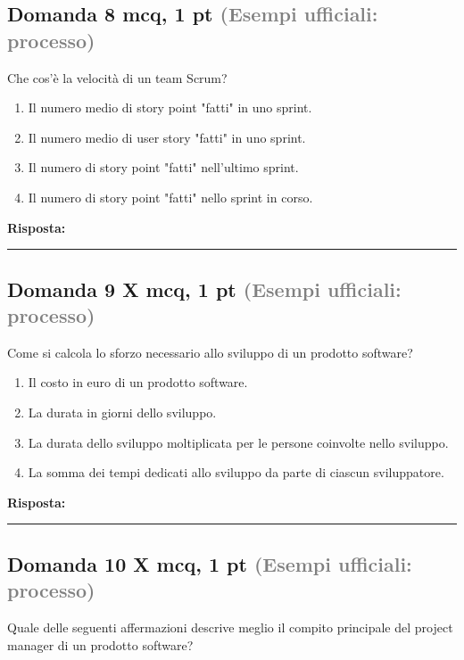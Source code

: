 \documentclass[a4paper,11pt]{article}
\begin{document}
\subsection*{Domanda 8 \hfill {\small mcq, 1 pt \textcolor{gray}{(Esempi ufficiali: processo)}}}
Che cos'è la velocità di un team Scrum?

\begin{enumerate}[label=\alph*)]
\item Il numero medio di story point "fatti" in uno sprint.
\item Il numero medio di user story "fatti" in uno sprint.
\item Il numero di story point "fatti" nell'ultimo sprint.
\item Il numero di story point "fatti" nello sprint in corso.
\end{enumerate}
\vspace{0.2cm}
\noindent\textbf{Risposta:}\par
\vspace{1.5cm}\hrule


\subsection*{Domanda 9 X \hfill {\small mcq, 1 pt \textcolor{gray}{(Esempi ufficiali: processo)}}}
Come si calcola lo sforzo necessario allo sviluppo di un prodotto software?

\begin{enumerate}[label=\alph*)]
\item Il costo in euro di un prodotto software.
\item La durata in giorni dello sviluppo.
\item La durata dello sviluppo moltiplicata per le persone coinvolte nello sviluppo.
\item La somma dei tempi dedicati allo sviluppo da parte di ciascun sviluppatore.
\end{enumerate}
\vspace{0.2cm}
\noindent\textbf{Risposta:}\par
\vspace{1.5cm}\hrule


\subsection*{Domanda 10 X \hfill {\small mcq, 1 pt \textcolor{gray}{(Esempi ufficiali: processo)}}}
Quale delle seguenti affermazioni descrive meglio il compito principale del project manager di un prodotto software?
\end{document}
